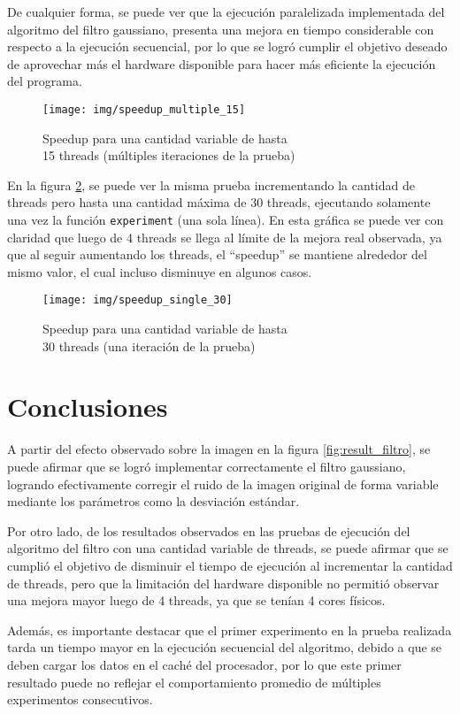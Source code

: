 \documentclass {article}
\begin{document}
De cualquier forma, se puede ver que la ejecución paralelizada implementada del algoritmo del filtro
gaussiano, presenta una mejora en tiempo considerable con respecto a la ejecución secuencial, por lo
que se logró cumplir el objetivo deseado de aprovechar más el hardware disponible para hacer más
eficiente la ejecución del programa.

\begin{figure}[H]
  \centering
  \texttt{[image: img/speedup\_multiple\_15]}
  \caption{\label{fig:speedup_multiple_15}Speedup para una cantidad variable de hasta \\15 threads (múltiples iteraciones de la prueba)}
\end{figure}

En la figura \ref{fig:speedup_single_30}, se puede ver la misma prueba incrementando la cantidad de
threads pero hasta una cantidad máxima de 30 threads, ejecutando solamente una vez la función
\texttt{experiment} (una sola línea). En esta gráfica se puede ver con claridad que luego de 4
threads se llega al límite de la mejora real observada, ya que al seguir aumentando los threads, el
``speedup'' se mantiene alrededor del mismo valor, el cual incluso disminuye en algunos casos. 

\begin{figure}[H]
  \centering
  \texttt{[image: img/speedup\_single\_30]}
  \caption{\label{fig:speedup_single_30}Speedup para una cantidad variable de hasta \\30 threads (una iteración de la prueba)}
\end{figure}

\section{Conclusiones}
A partir del efecto observado sobre la imagen en la figura \ref{fig:result_filtro}, se puede afirmar
que se logró implementar correctamente el filtro gaussiano, logrando efectivamente corregir el ruido
de la imagen original de forma variable mediante los parámetros como la desviación estándar.

Por otro lado, de los resultados observados en las pruebas de ejecución del algoritmo del filtro con
una cantidad variable de threads, se puede afirmar que se cumplió el objetivo de disminuir el tiempo
de ejecución al incrementar la cantidad de threads, pero que la limitación del hardware disponible
no permitió observar una mejora mayor luego de 4 threads, ya que se tenían 4 cores físicos.

Además, es importante destacar que el primer experimento en la prueba realizada tarda un tiempo
mayor en la ejecución secuencial del algoritmo, debido a que se deben cargar los datos en el caché
del procesador, por lo que este primer resultado puede no reflejar el comportamiento promedio de
múltiples experimentos consecutivos.
\end{document}
